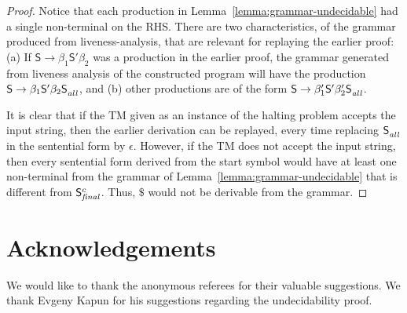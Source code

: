 \documentclass[9pt,nonatbib]{sigplanconf}
\begin{document}
\begin{proof}
Notice that  each production  in Lemma~\ref{lemma:grammar-undecidable}
had a single non-terminal on the RHS. There are two characteristics, of
the grammar produced from liveness-analysis,  that are relevant for
replaying the  earlier proof:  (a) If $\mathsf{S}  \rightarrow \beta_1
\mathsf{S'}  \beta_2$  was a  production  in  the earlier  proof,  the
grammar  generated from  liveness  analysis of the constructed program
will  have the  production
$\mathsf{S}      \rightarrow      \beta_1     \mathsf{S'}      \beta_2
\mathsf{S}_{\mathit{\mathit{all}}}^{}$,  and (b)  other  productions are  of the  form
$\mathsf{S}       \rightarrow       \beta_1'\mathsf{S'}       \beta_2'
\mathsf{S}_{\mathit{all}}^{}$.

It is clear that if the TM given as an instance of the halting problem
accepts the input string, then the earlier derivation can be replayed,
every   time   replacing   $\mathsf{S}_{\mathit{\mathit{all}}}^{}$   in   the
sentential form by $\epsilon$. However, if  the TM does not accept the
input string, then every sentential form derived from the start symbol
would    have     at    least    one    non-terminal from the grammar
of Lemma~\ref{lemma:grammar-undecidable} that is different
from $\mathsf{S}_{\mathit{final}}^{c}$.   Thus,  $\$$  would  not  be
derivable from the grammar.
\end{proof} \vspace*{-2mm}


\section*{Acknowledgements}
We would like to thank the anonymous referees for their valuable suggestions. We thank 
Evgeny Kapun for his suggestions regarding the undecidability proof.

\clearpage
\balance
{}

\end{document}
